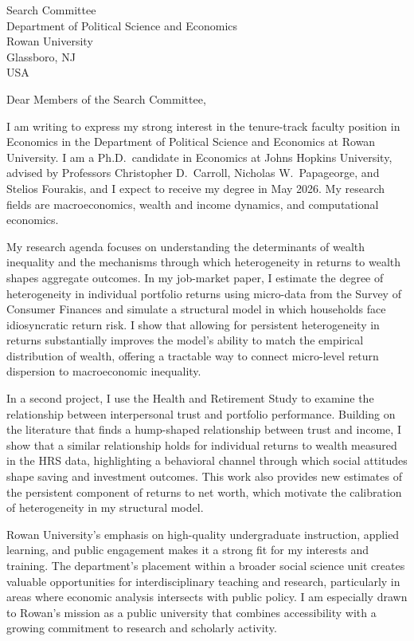 \documentclass[11pt,letterpaper]{letter}
\begin{document}
\begin{letter}{Search Committee \\
Department of Political Science and Economics \\
Rowan University \\
Glassboro, NJ \\ USA}

\opening{Dear Members of the Search Committee,}

I am writing to express my strong interest in the tenure-track faculty position in Economics in the Department of Political Science and Economics at Rowan University. I am a Ph.D.\ candidate in Economics at Johns Hopkins University, advised by Professors Christopher D.~Carroll, Nicholas W.~Papageorge, and Stelios Fourakis, and I expect to receive my degree in May 2026. My research fields are macroeconomics, wealth and income dynamics, and computational economics.

My research agenda focuses on understanding the determinants of wealth inequality and the mechanisms through which heterogeneity in returns to wealth shapes aggregate outcomes. In my job-market paper, I estimate the degree of heterogeneity in individual portfolio returns using micro-data from the Survey of Consumer Finances and simulate a structural model in which households face idiosyncratic return risk. I show that allowing for persistent heterogeneity in returns substantially improves the model’s ability to match the empirical distribution of wealth, offering a tractable way to connect micro-level return dispersion to macroeconomic inequality.

In a second project, I use the Health and Retirement Study to examine the relationship between interpersonal trust and portfolio performance. Building on the literature that finds a hump-shaped relationship between trust and income, I show that a similar relationship holds for individual returns to wealth measured in the HRS data, highlighting a behavioral channel through which social attitudes shape saving and investment outcomes. This work also provides new estimates of the persistent component of returns to net worth, which motivate the calibration of heterogeneity in my structural model.

Rowan University’s emphasis on high-quality undergraduate instruction, applied learning, and public engagement makes it a strong fit for my interests and training. The department’s placement within a broader social science unit creates valuable opportunities for interdisciplinary teaching and research, particularly in areas where economic analysis intersects with public policy. I am especially drawn to Rowan’s mission as a public university that combines accessibility with a growing commitment to research and scholarly activity.


\end{letter}
\end{document}
